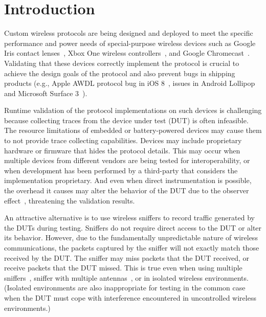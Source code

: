 
\section{Introduction}
\label{sec:intro}

Custom wireless protocols are being designed and deployed to meet the specific
performance and power needs of special-purpose wireless devices such as Google
Iris contact lenses~\cite{iris}, Xbox One wireless controllers~\cite{xbox}, and
Google Chromecast~\cite{chromecast}.  Validating that these devices correctly
implement the protocol is crucial to achieve the design goals of the protocol
and also prevent bugs in shipping products (e.g., Apple AWDL protocol bug in iOS
8~\cite{wifried}, \wifi{} issues in Android Lollipop~\cite{lollipop} and
Microsoft Surface 3~\cite{surface}).


Runtime validation of the protocol implementations on such devices is
challenging because collecting traces from the device under test (DUT) is often
infeasible.  The resource limitations of embedded or battery-powered devices may
cause them to not provide trace collecting capabilities. Devices may include
proprietary hardware or firmware that hides the protocol details. This may
occur when multiple devices from different vendors are being tested for
interoperability, or when development has been performed by a third-party that
considers the implementation proprietary.  And even when direct instrumentation
is possible, the overhead it causes may alter the behavior of the
DUT due to the observer effect~\cite{mytkowicz2008observer}, threatening the validation results.

An attractive alternative is to use wireless
sniffers to record traffic generated by the DUTs during testing.
Sniffers do not require direct access to the DUT or alter its behavior.
However, due to the fundamentally unpredictable nature of wireless
communications, the packets captured by the sniffer will not exactly match
those received by the DUT.
The sniffer may miss packets that the DUT received, or receive packets that
the DUT missed.
This is true even when using multiple
sniffers~\cite{cheng2006jigsaw,mahajan2006analyzing,bahl2006enhancing}, sniffer
with multiple antennas~\cite{omnipeek}, or in isolated wireless environments.
(Isolated environments are also inappropriate for testing in the common case
when the DUT must cope with interference encountered in uncontrolled wireless
environments.)


